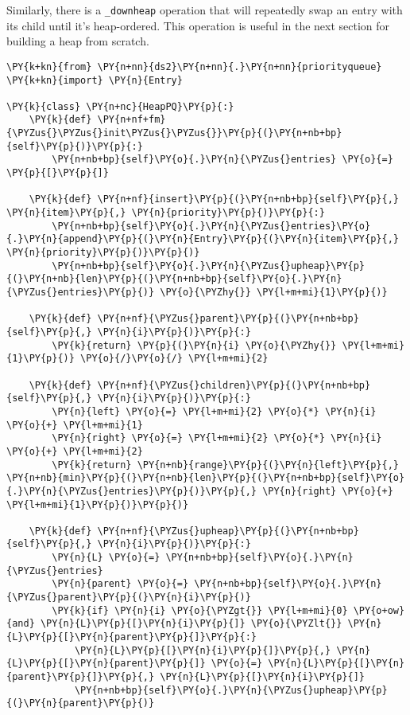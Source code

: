 Similarly, there is a \texttt{\_downheap} operation that will repeatedly swap an entry with its child until it's heap-ordered.  This operation is useful in the next section for building a heap from scratch.

\begin{Verbatim}[commandchars=\\\{\}]
\PY{k+kn}{from} \PY{n+nn}{ds2}\PY{n+nn}{.}\PY{n+nn}{priorityqueue} \PY{k+kn}{import} \PY{n}{Entry}

\PY{k}{class} \PY{n+nc}{HeapPQ}\PY{p}{:}
    \PY{k}{def} \PY{n+nf+fm}{\PYZus{}\PYZus{}init\PYZus{}\PYZus{}}\PY{p}{(}\PY{n+nb+bp}{self}\PY{p}{)}\PY{p}{:}
        \PY{n+nb+bp}{self}\PY{o}{.}\PY{n}{\PYZus{}entries} \PY{o}{=} \PY{p}{[}\PY{p}{]}

    \PY{k}{def} \PY{n+nf}{insert}\PY{p}{(}\PY{n+nb+bp}{self}\PY{p}{,} \PY{n}{item}\PY{p}{,} \PY{n}{priority}\PY{p}{)}\PY{p}{:}
        \PY{n+nb+bp}{self}\PY{o}{.}\PY{n}{\PYZus{}entries}\PY{o}{.}\PY{n}{append}\PY{p}{(}\PY{n}{Entry}\PY{p}{(}\PY{n}{item}\PY{p}{,} \PY{n}{priority}\PY{p}{)}\PY{p}{)}
        \PY{n+nb+bp}{self}\PY{o}{.}\PY{n}{\PYZus{}upheap}\PY{p}{(}\PY{n+nb}{len}\PY{p}{(}\PY{n+nb+bp}{self}\PY{o}{.}\PY{n}{\PYZus{}entries}\PY{p}{)} \PY{o}{\PYZhy{}} \PY{l+m+mi}{1}\PY{p}{)}

    \PY{k}{def} \PY{n+nf}{\PYZus{}parent}\PY{p}{(}\PY{n+nb+bp}{self}\PY{p}{,} \PY{n}{i}\PY{p}{)}\PY{p}{:}
        \PY{k}{return} \PY{p}{(}\PY{n}{i} \PY{o}{\PYZhy{}} \PY{l+m+mi}{1}\PY{p}{)} \PY{o}{/}\PY{o}{/} \PY{l+m+mi}{2}

    \PY{k}{def} \PY{n+nf}{\PYZus{}children}\PY{p}{(}\PY{n+nb+bp}{self}\PY{p}{,} \PY{n}{i}\PY{p}{)}\PY{p}{:}
        \PY{n}{left} \PY{o}{=} \PY{l+m+mi}{2} \PY{o}{*} \PY{n}{i} \PY{o}{+} \PY{l+m+mi}{1}
        \PY{n}{right} \PY{o}{=} \PY{l+m+mi}{2} \PY{o}{*} \PY{n}{i} \PY{o}{+} \PY{l+m+mi}{2}
        \PY{k}{return} \PY{n+nb}{range}\PY{p}{(}\PY{n}{left}\PY{p}{,} \PY{n+nb}{min}\PY{p}{(}\PY{n+nb}{len}\PY{p}{(}\PY{n+nb+bp}{self}\PY{o}{.}\PY{n}{\PYZus{}entries}\PY{p}{)}\PY{p}{,} \PY{n}{right} \PY{o}{+} \PY{l+m+mi}{1}\PY{p}{)}\PY{p}{)}

    \PY{k}{def} \PY{n+nf}{\PYZus{}upheap}\PY{p}{(}\PY{n+nb+bp}{self}\PY{p}{,} \PY{n}{i}\PY{p}{)}\PY{p}{:}
        \PY{n}{L} \PY{o}{=} \PY{n+nb+bp}{self}\PY{o}{.}\PY{n}{\PYZus{}entries}
        \PY{n}{parent} \PY{o}{=} \PY{n+nb+bp}{self}\PY{o}{.}\PY{n}{\PYZus{}parent}\PY{p}{(}\PY{n}{i}\PY{p}{)}
        \PY{k}{if} \PY{n}{i} \PY{o}{\PYZgt{}} \PY{l+m+mi}{0} \PY{o+ow}{and} \PY{n}{L}\PY{p}{[}\PY{n}{i}\PY{p}{]} \PY{o}{\PYZlt{}} \PY{n}{L}\PY{p}{[}\PY{n}{parent}\PY{p}{]}\PY{p}{:}
            \PY{n}{L}\PY{p}{[}\PY{n}{i}\PY{p}{]}\PY{p}{,} \PY{n}{L}\PY{p}{[}\PY{n}{parent}\PY{p}{]} \PY{o}{=} \PY{n}{L}\PY{p}{[}\PY{n}{parent}\PY{p}{]}\PY{p}{,} \PY{n}{L}\PY{p}{[}\PY{n}{i}\PY{p}{]}
            \PY{n+nb+bp}{self}\PY{o}{.}\PY{n}{\PYZus{}upheap}\PY{p}{(}\PY{n}{parent}\PY{p}{)}


\end{Verbatim}

